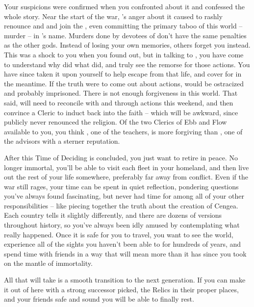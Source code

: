 \documentclass[char]{GL2020}
\begin{document}
Your suspicions were confirmed when you confronted \cChupAvenger{} about it and \cChupAvenger{\they} confessed the whole story. Near the start of the war, \cChupAvenger{}'s anger about it caused \cChupAvenger{\them} to rashly renounce \cEbb{} and \cFlow{} and join the \pGoaties{}, even committing the primary taboo of this world -- murder -- in \cGenesis{}'s name. Murders done by devotees of \cGenesis{} don't have the same penalties as the other gods. Instead of losing your own memories, others forget you instead. This was a shock to you when you found out, but in talking to \cChupAvenger{}, you have come to understand why \cChupAvenger{\they} did what \cChupAvenger{\they} did, and truly see the remorse \cChupAvenger{\they} \cChupAvenger{\have} for those actions. You have since taken it upon yourself to help \cChupAvenger{} escape from that life, and cover for \cChupAvenger{\them} in the meantime. If the truth were to come out about \cChupAvenger{\their} actions, \cChupAvenger{\they} would be ostracized and probably imprisoned. There is not enough forgiveness in this world. That said, \cChupAvenger{} will need to reconcile with \cEbb{} and \cFlow{} through \cChupAvenger{\their} actions this weekend, and then convince a Cleric to induct \cChupAvenger{\them} back into the faith -- which will be awkward, since publicly \cChupAvenger{\they} never renounced the \pShip{} religion. Of the two Clerics of Ebb and Flow available to you, you think \cFlowPriest{\full}, one of the teachers, is more forgiving than \cEbbPriest{\full}, one of the advisors with a sterner reputation. 

After this Time of Deciding is concluded, you just want to retire in peace. No longer immortal, you'll be able to visit each fleet in your homeland, and then live out the rest of your life somewhere, preferably far away from conflict. Even if the war still rages, your time can be spent in quiet reflection, pondering questions you've always found fascinating, but never had time for among all of your other responsibilities -- like piecing together the truth about the creation of Cengea. Each country tells it slightly differently, and there are dozens of versions throughout history, so you've always been idly amused by contemplating what really happened. Once it is safe for you to travel, you want to see the world, experience all of the sights you haven't been able to for hundreds of years, and spend time with friends in a way that will mean more than it has since you took on the mantle of immortality.

All that will take is a smooth transition to the next generation. If you can make it out of here with a strong successor picked, the Relics in their proper places, and your friends safe and sound you will be able to finally rest.
\end{document}
